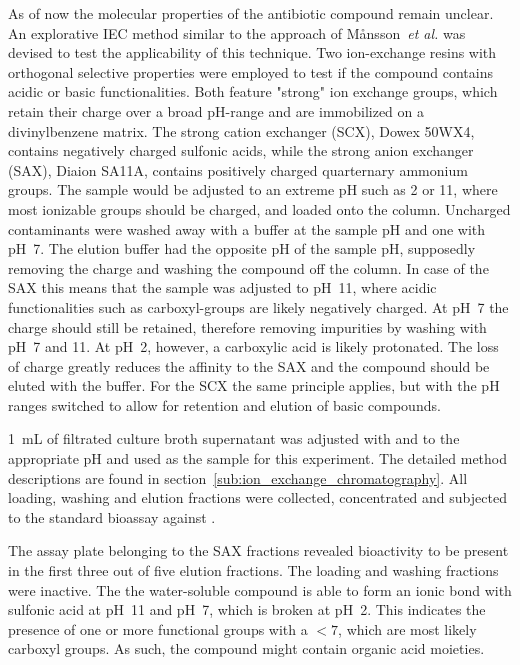 As of now the molecular properties of the antibiotic compound remain
unclear. An explorative IEC method similar to the approach of
M{\aa}nsson~\textit{et al.} was devised to test the applicability of this technique.\autocite{Mansson2010}
Two ion-exchange resins with orthogonal selective properties were employed to test if the compound contains acidic or basic functionalities.
Both feature "strong" ion exchange groups, which retain their charge over a broad pH-range and are immobilized on a divinylbenzene matrix.
The strong cation exchanger (SCX), Dowex 50WX4, contains negatively charged sulfonic acids, while the strong anion exchanger (SAX), Diaion SA11A, contains positively charged quarternary ammonium groups.
The sample would be adjusted to an extreme pH such as 2 or 11, where most ionizable groups should be charged, and loaded onto the column.
Uncharged contaminants were washed away with a buffer at the sample pH and one with pH~7.
The elution buffer had the opposite pH of the sample pH, supposedly removing the charge and washing the compound off the column.
In case of the SAX this means that the sample was adjusted to pH~11, where acidic functionalities such as carboxyl-groups are likely negatively charged.
At pH~7 the charge should still be retained, therefore removing impurities by washing with pH~7 and 11.
At pH~2, however, a carboxylic acid is likely protonated.
The loss of charge greatly reduces the affinity to the SAX and the compound should be eluted with the buffer.
For the SCX the same principle applies, but with the pH ranges switched to allow for retention and elution of basic compounds.

\SI{1}{\milli\liter} of filtrated culture broth supernatant was adjusted with  and  to the appropriate pH and used as the sample for this experiment.
The detailed method descriptions are found in section~\ref{sub:ion_exchange_chromatography}.
All loading, washing and elution fractions were collected, concentrated and subjected to the standard bioassay against \coli.

The assay plate belonging to the SAX fractions revealed bioactivity to be present in the first three out of five elution fractions.
The loading and washing fractions were inactive.
The the water-soluble compound is able to form an ionic bond with sulfonic acid at pH~11 and pH~7, which is broken at pH~2.
This indicates the presence of one or more functional groups with a \pka$<7$, which are most likely carboxyl groups.
As such, the compound might contain organic acid moieties.

